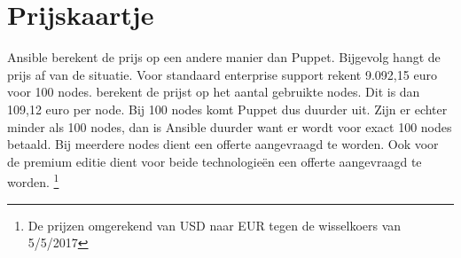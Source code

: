 



 \section{Prijskaartje}

Ansible berekent de prijs op een andere manier dan Puppet. Bijgevolg hangt de prijs af van de situatie. Voor standaard enterprise support rekent \textcite{ansibleprice} 9.092,15 euro voor 100 nodes. \textcite{puppetprice} berekent de prijst op het aantal gebruikte nodes. Dit is dan 109,12 euro per node. Bij 100 nodes komt Puppet dus duurder uit. Zijn er echter minder als 100 nodes, dan is Ansible duurder want er wordt voor exact 100 nodes betaald. Bij meerdere nodes dient een offerte aangevraagd te worden. Ook voor de premium editie dient voor beide technologie\"en een offerte aangevraagd te worden. \footnote{De prijzen omgerekend van USD naar EUR tegen de wisselkoers van 5/5/2017}

